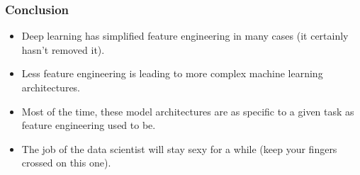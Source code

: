 \begin{frame}[fragile]\frametitle{Conclusion}
	\begin{itemize}
	\item Deep learning has simplified feature engineering in many cases (it certainly hasn't removed it).
	\item Less feature engineering is leading to more complex machine learning architectures.
	\item Most of the time, these model architectures are as specific to a given task as feature engineering used to be.
	\item The job of the data scientist will stay sexy for a while (keep your fingers crossed on this one).
	\end{itemize}
\end{frame}
